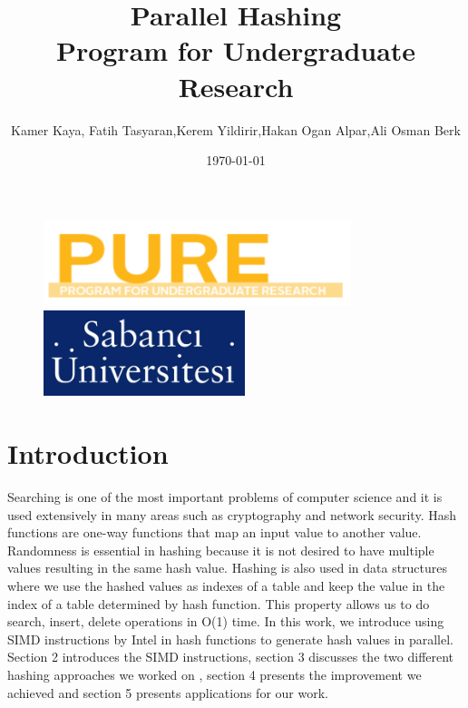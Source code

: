 \documentclass[11pt,oneside,a4paper]{article}
\title{\vspace*{40.0mm}
  \bf\sf Parallel Hashing
         \vspace*{20.0mm} \\
  \vspace*{40.0mm}
  \Large\bf\sf Program for Undergraduate Research \vspace*{20.0mm}}
\author{\sf Kamer Kaya, Fatih Tasyaran,Kerem Yildirir,Hakan Ogan Alpar,Ali Osman Berk}
\date{\sf \today}
\makeatletter
\def\cleardoublepage{\clearpage\if@twoside \ifodd\c@page\else%
\hbox{}%
\thispagestyle{empty}%
\clearpage%
\if@twocolumn\hbox{}\clearpage\fi\fi\fi}
\makeatother
\begin{document}
\begin{figure}
  \parbox[t]{40mm}{
    \begin{flushleft}
      \includegraphics[height=25mm]{pure.png}
    \end{flushleft}}
    \hspace{7cm}
  \parbox[t]{40mm}{
    \begin{flushright}
      \includegraphics[height=25mm]{sabanj.png}
    \end{flushright}}
\end{figure}

\maketitle
\thispagestyle{empty}
\raggedbottom

\cleardoublepage
{}
\setcounter{tocdepth}{2}
\tableofcontents


\section{Introduction}
\par Searching is one of the most important problems of computer science and it is used extensively in many areas such as cryptography and network security. Hash functions are one-way functions that map an input value to another value. Randomness is essential in hashing because it is not desired to have multiple values resulting in the same hash value. Hashing is also used in  data structures where we use the hashed values as indexes of a table  and keep the value in the index of a table determined by hash function. This property allows us to do search, insert, delete operations in O(1) time. In this work, we introduce using SIMD instructions by Intel in hash functions to generate hash values in parallel. Section 2 introduces the  SIMD instructions,  section 3 discusses the two different hashing approaches we worked on , section 4 presents the improvement we achieved and section 5 presents applications for our work.
\end{document}
